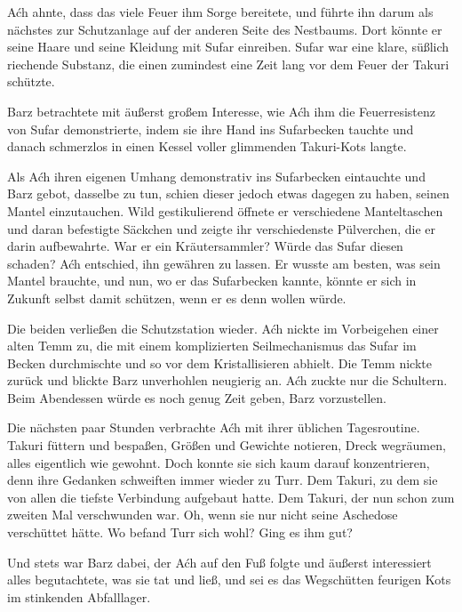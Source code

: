 Aćh ahnte, dass das viele Feuer ihm Sorge bereitete, und führte ihn darum als nächstes zur Schutzanlage auf der anderen Seite des Nestbaums. Dort könnte er seine Haare und seine Kleidung mit Sufar einreiben. Sufar war eine klare, süßlich riechende Substanz, die einen zumindest eine Zeit lang vor dem Feuer der Takuri schützte.

Barz betrachtete mit äußerst großem Interesse, wie Aćh ihm die Feuerresistenz von Sufar demonstrierte, indem sie ihre Hand ins Sufarbecken tauchte und danach schmerzlos in einen Kessel voller glimmenden Takuri-Kots langte.

Als Aćh ihren eigenen Umhang demonstrativ ins Sufarbecken eintauchte und Barz gebot, dasselbe zu tun, schien dieser jedoch etwas dagegen zu haben, seinen Mantel einzutauchen. Wild gestikulierend öffnete er verschiedene Manteltaschen und daran befestigte Säckchen und zeigte ihr verschiedenste Pülverchen, die er darin aufbewahrte. War er ein Kräutersammler? Würde das Sufar diesen schaden? Aćh entschied, ihn gewähren zu lassen. Er wusste am besten, was sein Mantel brauchte, und nun, wo er das Sufarbecken kannte, könnte er sich in Zukunft selbst damit schützen, wenn er es denn wollen würde.

Die beiden verließen die Schutzstation wieder. Aćh nickte im Vorbeigehen einer alten Temm zu, die mit einem komplizierten Seilmechanismus das Sufar im Becken durchmischte und so vor dem Kristallisieren abhielt. Die Temm nickte zurück und blickte Barz unverhohlen neugierig an. Aćh zuckte nur die Schultern. Beim Abendessen würde es noch genug Zeit geben, Barz vorzustellen.

Die nächsten paar Stunden verbrachte Aćh mit ihrer üblichen Tagesroutine. Takuri füttern und bespaßen, Größen und Gewichte notieren, Dreck wegräumen, alles eigentlich wie gewohnt. Doch konnte sie sich kaum darauf konzentrieren, denn ihre Gedanken schweiften immer wieder zu Turr. Dem Takuri, zu dem sie von allen die tiefste Verbindung aufgebaut hatte. Dem Takuri, der nun schon zum zweiten Mal verschwunden war. Oh, wenn sie nur nicht seine Aschedose verschüttet hätte. Wo befand Turr sich wohl? Ging es ihm gut?

Und stets war Barz dabei, der Aćh auf den Fuß folgte und äußerst interessiert alles begutachtete, was sie tat und ließ, und sei es das Wegschütten feurigen Kots im stinkenden Abfalllager.\bigskip







